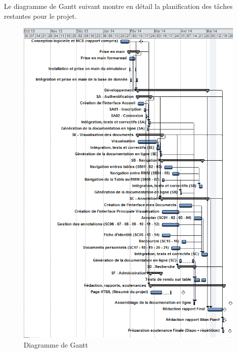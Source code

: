 \documentclass[a4paper]{article}
\begin{document}
	Le diagramme de Gantt suivant montre en détail la planification des tâches restantes pour le projet.

\begin{figure}[H]
\centering
\includegraphics[width=\textwidth]{gantt.png}
\caption{Diagramme de Gantt}
\label{fig:gantt}
\end{figure}
\end{document}
